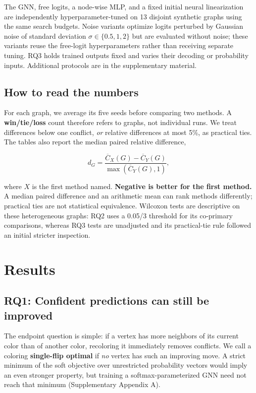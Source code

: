 \documentclass[11pt,letterpaper,twocolumn]{article}
\begin{document}
The GNN, free logits, a node-wise MLP, and a fixed initial neural linearization are independently hyperparameter-tuned on 13 disjoint synthetic graphs using the same search budgets. Noise variants optimize logits perturbed by Gaussian noise of standard deviation \(\sigma\in\{0.5,1,2\}\) but are evaluated without noise; these variants reuse the free-logit hyperparameters rather than receiving separate tuning. RQ3 holds trained outputs fixed and varies their decoding or probability inputs. Additional protocols are in the supplementary material.

\subsection{How to read the numbers}\label{how-to-read-the-numbers}

For each graph, we average its five seeds before comparing two methods. A \textbf{win/tie/loss} count therefore refers to graphs, not individual runs. We treat differences below one conflict, \emph{or} relative differences at most 5\%, as practical ties. The tables also report the median paired relative difference,

\[
d_G=\frac{\overline{C}_X(G)-\overline{C}_Y(G)}{\max(\overline{C}_Y(G),1)},
\]

where \(X\) is the first method named. \textbf{Negative is better for the first method.} A median paired difference and an arithmetic mean can rank methods differently; practical ties are not statistical equivalence. Wilcoxon tests are descriptive on these heterogeneous graphs: RQ2 uses a 0.05/3 threshold for its co-primary comparisons, whereas RQ3 tests are unadjusted and its practical-tie rule followed an initial stricter inspection.

\section{Results}\label{results}

\subsection{RQ1: Confident predictions can still be improved}\label{rq1-confident-predictions-can-still-be-improved}

The endpoint question is simple: if a vertex has more neighbors of its current color than of another color, recoloring it immediately removes conflicts. We call a coloring \textbf{single-flip optimal} if \emph{no} vertex has such an improving move. A strict minimum of the soft objective over unrestricted probability vectors would imply an even stronger property, but training a softmax-parameterized GNN need not reach that minimum (Supplementary Appendix A).
\end{document}
